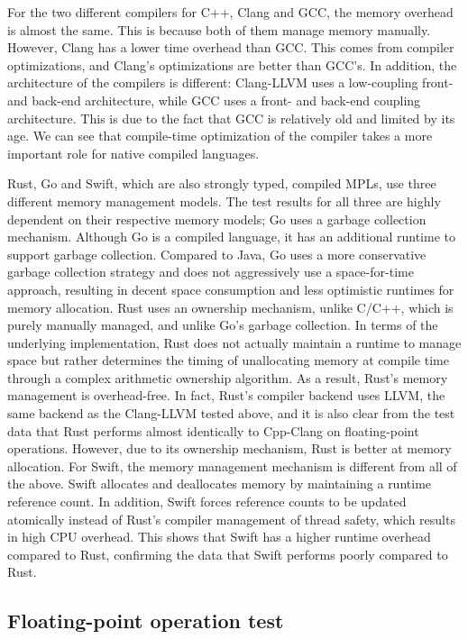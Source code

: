 For the two different compilers for C++, Clang and GCC, the memory overhead is almost the same. This is because both of them manage memory manually. However, Clang has a lower time overhead than GCC. This comes from compiler optimizations, and Clang's optimizations are better than GCC's. In addition, the architecture of the compilers is different: Clang-LLVM uses a low-coupling front- and back-end architecture, while GCC uses a front- and back-end coupling architecture. This is due to the fact that GCC is relatively old and limited by its age. We can see that compile-time optimization of the compiler takes a more important role for native compiled languages.

Rust, Go and Swift, which are also strongly typed, compiled MPLs, use three different memory management models. The test results for all three are highly dependent on their respective memory models; Go uses a garbage collection mechanism. Although Go is a compiled language, it has an additional runtime to support garbage collection. Compared to Java, Go uses a more conservative garbage collection strategy and does not aggressively use a space-for-time approach, resulting in decent space consumption and less optimistic runtimes for memory allocation. Rust uses an ownership mechanism, unlike C/C++, which is purely manually managed, and unlike Go's garbage collection. In terms of the underlying implementation, Rust does not actually maintain a runtime to manage space but rather determines the timing of unallocating memory at compile time through a complex arithmetic ownership algorithm. As a result, Rust's memory management is overhead-free. In fact, Rust's compiler backend uses LLVM, the same backend as the Clang-LLVM tested above, and it is also clear from the test data that Rust performs almost identically to Cpp-Clang on floating-point operations. However, due to its ownership mechanism, Rust is better at memory allocation. For Swift, the memory management mechanism is different from all of the above. Swift allocates and deallocates memory by maintaining a runtime reference count. In addition, Swift forces reference counts to be updated atomically instead of Rust's compiler management of thread safety, which results in high CPU overhead. This shows that Swift has a higher runtime overhead compared to Rust, confirming the data that Swift performs poorly compared to Rust.

\subsection{Floating-point operation test}

